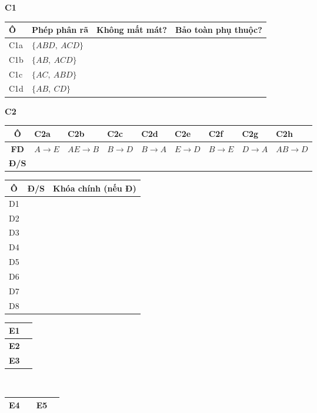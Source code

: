 \documentclass[11pt,a4paper]{article}
\begin{document}
\textbf{C1}\par\smallskip
\begin{center}
\begin{tabular}{|l|p{3.1cm}|>{\centering\arraybackslash}p{3.6cm}|>{\centering\arraybackslash}p{4.2cm}|}
\hline
\textbf{Ô} & \textbf{Phép phân rã} & \textbf{Không mất mát?} & \textbf{Bảo toàn phụ thuộc?}\\\hline
C1a & $\{ABD,\ ACD\}$ & & \\\hline
C1b & $\{AB,\ ACD\}$ & & \\\hline
C1c & $\{AC,\ ABD\}$ & & \\\hline
C1d & $\{AB,\ CD\}$ & & \\\hline
\end{tabular}
\end{center}
\textbf{C2}\par\smallskip
\begin{center}
\begin{tabular}{|>{\bfseries}c|*{8}{w{c}{1.3cm}|}}
\hline
Ô & \textbf{C2a} & \textbf{C2b} & \textbf{C2c} & \textbf{C2d} & \textbf{C2e} & \textbf{C2f} & \textbf{C2g} & \textbf{C2h}\\\hline
FD & $A\to E$ & $AE\to B$ & $B\to D$ & $B\to A$ & $E\to D$ & $B\to E$ & $D\to A$ & $AB\to D$\\\hline
Đ/S & & & & & & & & \\\hline
\end{tabular}
\end{center}

\newpage
{}
\begin{center}
\begin{tabular}{|c|>{\centering\arraybackslash}p{1.6cm}|p{10.5cm}|}
\hline
\textbf{Ô} & \textbf{Đ/S} & \textbf{Khóa chính (nếu Đ)}\\\hline
D1 & & \\\hline
D2 & & \\\hline
D3 & & \\\hline
D4 & & \\\hline
D5 & & \\\hline
D6 & & \\\hline
D7 & & \\\hline
D8 & & \\\hline
\end{tabular}
\end{center}

\begin{center}
\begin{tabular}{|c|p{13.5cm}|}
\hline
\textbf{E1} & \\\hline
\textbf{E2} & \\\hline
\textbf{E3} & \\\hline
\end{tabular}
\\[6pt]
\begin{tabular}{|c|p{3cm}|c|p{3cm}|}
\hline
\textbf{E4} & & \textbf{E5} & \\\hline
\end{tabular}
\end{center}
\end{document}
